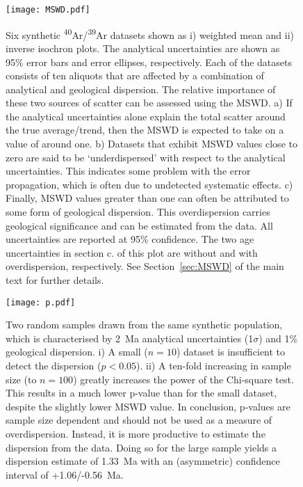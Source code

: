 \documentclass{article}
\begin{document}
\begin{figure}
  \centering
  \texttt{[image: MSWD.pdf]}
  \caption{Six synthetic \textsuperscript{40}Ar/\textsuperscript{39}Ar
    datasets shown as i) weighted mean and ii) inverse isochron plots.
    The analytical uncertainties are shown as 95\% error bars and
    error ellipses, respectively. Each of the datasets consists of ten
    aliquots that are affected by a combination of analytical and
    geological dispersion.  The relative importance of these two
    sources of scatter can be assessed using the MSWD. a) If the
    analytical uncertainties alone explain the total scatter around
    the true average/trend, then the MSWD is expected to take on a
    value of around one. b) Datasets that exhibit MSWD values close to
    zero are said to be `underdispersed' with respect to the
    analytical uncertainties.  This indicates some problem with the
    error propagation, which is often due to undetected systematic
    effects.  c) Finally, MSWD values greater than one can often be
    attributed to some form of geological dispersion. This
    overdispersion carries geological significance and can be
    estimated from the data. All uncertainties are reported at 95\%
    confidence. The two age uncertainties in section c. of this plot
    are without and with overdispersion, respectively. See
    Section~\ref{sec:MSWD} of the main text for further details.}
  \label{fig:MSWD}
\end{figure}

\begin{figure}
  \centering
  \texttt{[image: p.pdf]}
  \caption{Two random samples drawn from the same synthetic
    population, which is characterised by 2~Ma analytical
    uncertainties (1$\sigma$) and 1\% geological dispersion. i) A
    small ($n = 10$) dataset is insufficient to detect the dispersion
    ($p < 0.05$). ii) A ten-fold increasing in sample size (to
    $n=100$) greatly increases the power of the Chi-square test.  This
    results in a much lower p-value than for the small dataset,
    despite the slightly lower MSWD value. In conclusion, p-values are
    sample size dependent and should not be used as a measure of
    overdispersion. Instead, it is more productive to estimate the
    dispersion from the data. Doing so for the large sample yields a
    dispersion estimate of 1.33~Ma with an (asymmetric) confidence
    interval of +1.06/-0.56~Ma.}
  \label{fig:p}
\end{figure}
\end{document}
